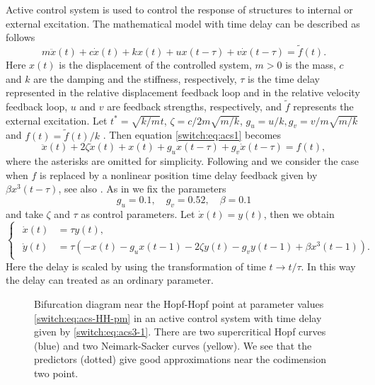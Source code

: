 Active control system is used to control the response of structures to internal or external excitation. The mathematical model with time delay can be described as follows \cite{Peng2013}
\begin{equation}
m\ddot{x}(t)+c\dot{x}(t)+kx(t)+ux(t-\tau)+v\dot{x}(t-\tau)=\tilde{f}(t).\label{switch:eq:acs1}
\end{equation}
Here $x(t)$ is the displacement of the controlled system, $m>0$ is the mass, $c$ and $k$ are the damping and the stiffness, respectively, $\tau$ is the time delay represented in the relative displacement feedback loop and in the relative velocity feedback loop, $u$ and $v$ are feedback strengths, respectively, and $\tilde{f}$ represents the external excitation. Let $t^{*}=\sqrt{k/m}t$, $\zeta=c/2m\sqrt{m/k}$, $g_{u}=u/k,g_{v}=v/m\sqrt{m/k}$ and $f(t)=\tilde{f}(t)/k$ . Then equation \cref{switch:eq:acs1} becomes
\[
\ddot{x}(t)+2\zeta\dot{x}(t)+x(t)+g_{u}x(t-\tau)+g_{v}\dot{x}(t-\tau)=f(t),
\]
where the asterisks are omitted for simplicity. Following \cite{Ding@2016} and \cite{Peng2013} we consider the case when $f$ is replaced by a nonlinear position time delay feedback given  by $\beta x^{3}(t-\tau)$, see also \cite{xu2003vanderPolDuffing}. As in \cite{Ding@2016} we fix the parameters
\[
g_{u}=0.1,\quad g_{v}=0.52,\quad\beta=0.1
\]
and take $\zeta$ and $\tau$ as control parameters.
Let $\dot{x}(t)=y(t)$, then we obtain
\begin{equation}
\begin{cases}
\begin{aligned}
\dot{x}(t)&=\tau y(t),\\
\dot{y}(t)&=\tau\left(-x(t)-g_{u}x(t-1)-2\zeta y(t)-g_{v}y(t-1)+\beta x^{3}(t-1) \right).
\end{aligned}
\end{cases}\label{switch:eq:acs3-1}
\end{equation}
Here the delay is scaled by using the transformation of time $t\rightarrow t/\tau$. In this way the delay can treated as an ordinary parameter.

\begin{figure}[htbp]
\caption{Bifurcation diagram near the Hopf-Hopf point at parameter values \cref{switch:eq:acs-HH-pm} in an active control system with time delay given by \cref{switch:eq:acs3-1}. There are two supercritical Hopf curves (blue) and two Neimark-Sacker curves (yellow).  We see that the predictors (dotted) give good approximations near the codimension two point.}
\label{switch:fig:acs_hoho_predictors}
\end{figure}

